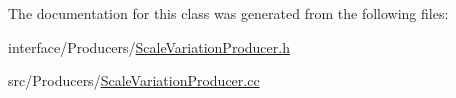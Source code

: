 The documentation for this class was generated from the following files:\begin{DoxyCompactItemize}
\item 
interface/Producers/\hyperlink{ScaleVariationProducer_8h}{ScaleVariationProducer.h}\item 
src/Producers/\hyperlink{ScaleVariationProducer_8cc}{ScaleVariationProducer.cc}\end{DoxyCompactItemize}

